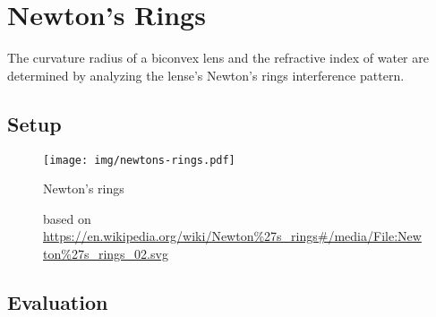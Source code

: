 \chapter{Newton's Rings}

The curvature radius of a biconvex lens and the refractive index of water are determined by analyzing the lense's Newton's rings interference pattern.

\section{Setup}

\begin{figure}
	\centering
	\texttt{[image: img/newtons-rings.pdf]}
	\caption{Newton's rings}
	\caption*{based on \url{https://en.wikipedia.org/wiki/Newton\%27s_rings\#/media/File:Newton\%27s_rings_02.svg}}
\end{figure}

\section{Evaluation}
